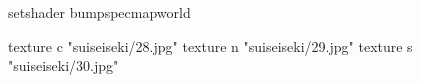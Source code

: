 setshader bumpspecmapworld

    texture c "suiseiseki/28.jpg"
    texture n "suiseiseki/29.jpg"
    texture s "suiseiseki/30.jpg"
